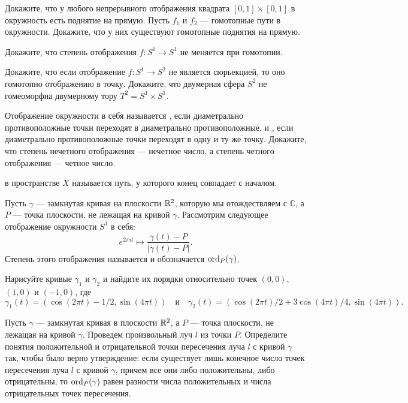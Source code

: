 \documentclass[a4paper,12pt]{article}
\newcommand{\0}[1]{\overline{#1}}
\renewcommand{\C}{\mathbb{C}}
\begin{document}
\vfill
{}
\newpage


Докажите, что у любого непрерывного отображения квадрата $[0,1]\times
[0,1]$ в окружность есть поднятие на прямую.
Пусть $f_1$ и $f_2$ --- гомотопные пути в окружности. Докажите,
что у них существуют гомотопные поднятия на прямую.


Докажите, что степень отображения $f:S^1\to S^1$ не меняется при гомотопии.

Докажите, что если отображение $f:S^1\to S^2$ не является
сюрьекцией, то оно гомотопно отображению в точку.
Докажите, что двумерная сфера $S^2$ не гомеоморфна двумерному тору
$T^2=S^1\times S^1$.

Отображение окружности в себя называется , если
диаметрально противоположные точки переходят в диаметрально
противоположные, и , если диаметрально противоположные точки
переходят в одну и ту же точку. Докажите, что степень нечетного
отображения --- нечетное число, а степень четного отображения --- четное
число.

 в пространстве $X$ называется путь, у которого
конец совпадает с началом.

Пусть $\gamma$ --- замкнутая кривая на плоскости $\mathbb{R}^2$, которую мы
отождествляем с $\C$, а $P$ --- точка
плоскости, не лежащая на кривой $\gamma$. Рассмотрим следующее
отображение окружности $S^1$ в себя:
$$
e^{2\pi it}\mapsto\frac{\gamma(t)-P}{|\gamma(t)-P|}.
$$
Степень этого отображения называется  и обозначается $\operatorname{ord}_P(\gamma)$.

Нарисуйте кривые $\gamma_1$ и $\gamma_2$ и найдите их порядки
относительно точек $(0,0)$, $(1,0)$ и $(-1,0)$, где
$$\gamma_1(t)=(\cos(2\pi t)-1/2,\sin(4\pi t))\quad\mbox{и}\quad
\gamma_2(t)=(\cos(2\pi t)/2+3\cos(4\pi t)/4,\sin(4\pi t)).$$
\vspace{-\baselineskip}

Пусть $\gamma$ --- замкнутая кривая в плоскости $\mathbb{R}^2$, а $P$ --- точка
плоскости, не лежащая на кривой $\gamma$. Проведем произвольный луч $l$ из
точки $P$. Определите понятия положительной и отрицательной точки
пересечения луча $l$ с кривой $\gamma$ так, чтобы было верно
утверждение:
если существует лишь конечное число точек пересечения луча $l$ с кривой
$\gamma$, причем все они либо положительны, либо отрицательны, то
$\operatorname{ord}_P(\gamma)$ равен разности числа положительных и числа
отрицательных точек пересечения.
\end{document}
